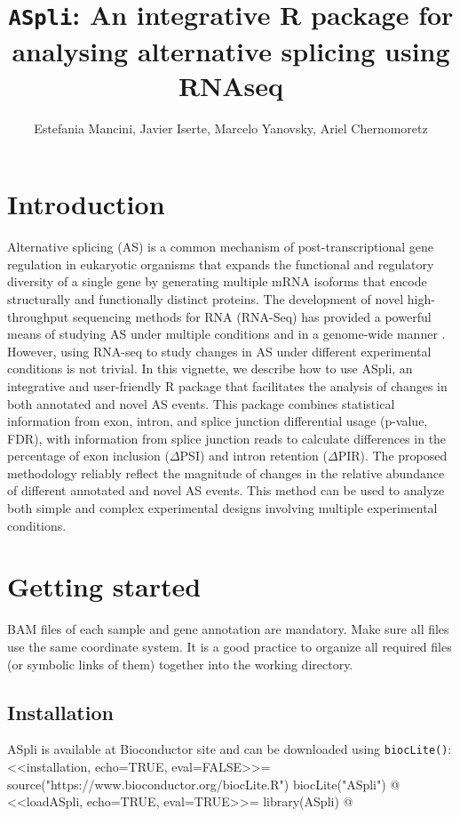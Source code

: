 \documentclass{article}
\title{\texttt{ASpli}: An integrative R package for analysing alternative 
  splicing using RNAseq}
\author{Estefania Mancini, Javier Iserte, Marcelo Yanovsky, Ariel Chernomoretz}
\begin{document}

\maketitle

\tableofcontents

\section{Introduction}

Alternative splicing (AS) is a common mechanism of post-transcriptional gene 
regulation in eukaryotic organisms that expands the functional and regulatory 
diversity of a single gene by generating multiple mRNA isoforms that encode 
structurally and functionally distinct proteins. The development of novel 
high-throughput sequencing methods for RNA (RNA-Seq) has provided a powerful 
means of studying AS under multiple conditions and in a genome-wide manner 
\cite{pmid24549677}. However, using RNA-seq to study changes in AS under 
different experimental conditions is not trivial. 
In this vignette, we describe how to use ASpli, an integrative and user-friendly
R package that facilitates the analysis of changes in both annotated and novel 
AS events. This package combines statistical information from exon, intron, and 
splice junction differential usage (p-value, FDR), with information from splice 
junction reads to calculate differences in the percentage of exon inclusion 
($\Delta$PSI) and intron retention ($\Delta$PIR). The proposed methodology 
reliably reflect the magnitude of changes in the relative abundance of different 
annotated and novel AS events. This method can be used to analyze both simple 
and complex experimental designs involving multiple experimental conditions.

\section{Getting started}

BAM files of each sample and gene annotation are mandatory. Make sure all files 
use the same coordinate system. It is a good practice to organize all required 
files (or symbolic links of them) together into the  working directory.

\subsection{Installation}
ASpli is available at Bioconductor site and can be downloaded using
\texttt{biocLite()}:
<<installation, echo=TRUE, eval=FALSE>>=
source("https://www.bioconductor.org/biocLite.R")
biocLite("ASpli")
@
<<loadASpli, echo=TRUE, eval=TRUE>>=
library(ASpli)
@
 
\end{document}
